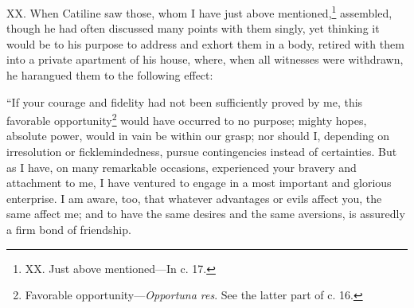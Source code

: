 XX. When Catiline saw those, whom I have just above mentioned,\footnote{XX. Just above mentioned—In c. 17.}
assembled, though he had often discussed many points with them singly,
yet thinking it would be to his purpose to address and exhort them in
a body, retired with them into a private apartment of his house,
where, when all witnesses were withdrawn, he harangued them to the
following effect:

``If your courage and fidelity had not been sufficiently proved by me,
this favorable opportunity\footnote{Favorable opportunity—\emph{Opportuna res}. See the latter part
of c. 16.} would have occurred to no purpose;
mighty hopes, absolute power, would in vain be within our grasp; nor
should I, depending on irresolution or ficklemindedness, pursue
contingencies instead of certainties. But as I have, on many remarkable
occasions, experienced your bravery and attachment to me, I have
ventured to engage in a most important and glorious enterprise. I am
aware, too, that whatever advantages or evils affect you, the same
affect me; and to have the same desires and the same aversions, is
assuredly a firm bond of friendship.

